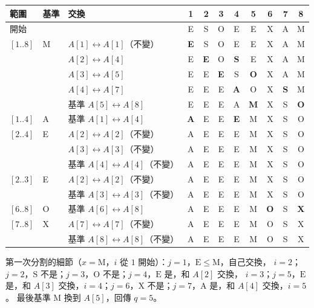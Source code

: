 \begin{pastsoln}
\begin{center}
\small
\begin{tabular}{lll*{8}{c}}
\toprule
範圍 & 基準 & 交換 & 1 & 2 & 3 & 4 & 5 & 6 & 7 & 8 \\
\midrule
開始 & & & E & S & O & E & E & X & A & M \\
\midrule
$[1..8]$ & M & $A[1] \leftrightarrow A[1]$（不變） & \textbf{E} & S & O & E & E & X & A & M \\
 & & $A[2] \leftrightarrow A[4]$ & E & \textbf{E} & O & \textbf{S} & E & X & A & M \\
 & & $A[3] \leftrightarrow A[5]$ & E & E & \textbf{E} & S & \textbf{O} & X & A & M \\
 & & $A[4] \leftrightarrow A[7]$ & E & E & E & \textbf{A} & O & X & \textbf{S} & M \\
 & & 基準 $A[5] \leftrightarrow A[8]$ & E & E & E & A & \textbf{M} & X & S & \textbf{O} \\
\midrule
$[1..4]$ & A & 基準 $A[1] \leftrightarrow A[4]$ & \textbf{A} & E & E & \textbf{E} & M & X & S & O \\
\midrule
$[2..4]$ & E & $A[2] \leftrightarrow A[2]$（不變） & A & E & E & E & M & X & S & O \\
 & & $A[3] \leftrightarrow A[3]$（不變） & A & E & E & E & M & X & S & O \\
 & & 基準 $A[4] \leftrightarrow A[4]$（不變） & A & E & E & E & M & X & S & O \\
\midrule
$[2..3]$ & E & $A[2] \leftrightarrow A[2]$（不變） & A & E & E & E & M & X & S & O \\
 & & 基準 $A[3] \leftrightarrow A[3]$（不變） & A & E & E & E & M & X & S & O \\
\midrule
$[6..8]$ & O & 基準 $A[6] \leftrightarrow A[8]$ & A & E & E & E & M & \textbf{O} & S & \textbf{X} \\
\midrule
$[7..8]$ & X & $A[7] \leftrightarrow A[7]$（不變） & A & E & E & E & M & O & S & X \\
 & & 基準 $A[8] \leftrightarrow A[8]$（不變） & A & E & E & E & M & O & S & X \\
\bottomrule
\end{tabular}
\end{center}

第一次分割的細節（$x = \mathrm{M}$，$i$ 從 $1$ 開始）：$j = 1$，$\mathrm{E} \le \mathrm{M}$，自己交換，
$i = 2$；$j = 2$，$\mathrm{S}$ 不是；$j = 3$，$\mathrm{O}$ 不是；$j = 4$，$\mathrm{E}$ 是，和 $A[2]$ 交換，
$i = 3$；$j = 5$，$\mathrm{E}$ 是，和 $A[3]$ 交換，$i = 4$；$j = 6$，$\mathrm{X}$ 不是；$j = 7$，$\mathrm{A}$
是，和 $A[4]$ 交換，$i = 5$。 最後基準 $\mathrm{M}$ 換到 $A[5]$，回傳 $q = 5$。


\end{pastsoln}
